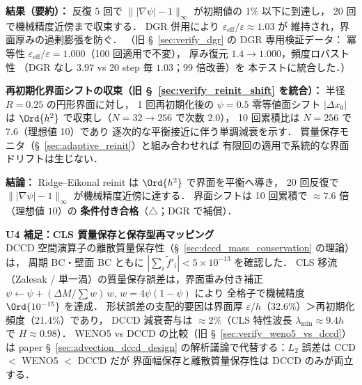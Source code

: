 \noindent\textbf{結果（要約）：}
反復 5 回で $\||\nabla\psi| - 1\|_\infty$ が初期値の 1\% 以下に到達し，
20 回で機械精度近傍まで収束する．
DGR 併用により $\varepsilon_{\mathrm{eff}}/\varepsilon \approx 1.03$ が
維持され，界面厚みの過剰膨張を防ぐ．
（旧 §~\ref{sec:verify_dgr} の DGR 専用検証データ：
冪等性 $\varepsilon_{\mathrm{eff}}/\varepsilon = 1.000$（100 回適用で不変），
厚み復元 $1.4 \to 1.000$，頻度ロバスト性
（DGR なし $3.97$ vs 20 step 毎 $1.03$；99 倍改善）を
本テストに統合した．）
\label{sec:verify_dgr}%

\medskip
\noindent\textbf{再初期化界面シフトの収束（旧 §~\ref{sec:verify_reinit_shift} を統合）：}
\label{sec:verify_reinit_shift}
半径 $R = 0.25$ の円形界面に対し，
1 回再初期化後の $\psi = 0.5$ 零等値面シフト $|\Delta x_0|$ は
$\Ord{h^2}$ で収束し（$N = 32 \to 256$ で次数 $2.0$），
10 回累積比は $N = 256$ で 7.6（理想値 10）であり
逐次的な平衡接近に伴う単調減衰を示す．
質量保存モニタ（§~\ref{sec:adaptive_reinit}）と組み合わせれば
有限回の適用で系統的な界面ドリフトは生じない．

\noindent\textbf{結論：}
Ridge--Eikonal reinit は $\Ord{h^2}$ で界面を平衡へ導き，
20 回反復で $\||\nabla\psi| - 1\|_\infty$ が機械精度近傍に達する．
界面シフトは 10 回累積で $\approx 7.6$ 倍（理想値 $10$）の
\textbf{条件付き合格}（$\triangle$；DGR で補償）．

\medskip
\noindent\textbf{U4 補足：CLS 質量保存と保存型再マッピング}\\
\noindent\label{sec:verify_cls_advection}%
\noindent\label{sec:verify_dccd_conservation}%
DCCD 空間演算子の離散質量保存性（§~\ref{sec:dccd_mass_conservation} の理論）は，
周期 BC・壁面 BC ともに $|\sum_i \tilde{f}'_i| < 5 \times 10^{-13}$ を確認した．
CLS 移流（Zalesak / 単一渦）の質量保存誤差は，界面重み付き補正
$\psi \leftarrow \psi + (\Delta M / \sum w)\,w$, $w = 4\psi(1 - \psi)$ により
全格子で機械精度 $\Ord{10^{-15}}$ を達成．
形状誤差の支配的要因は界面厚 $\varepsilon/h$（32.6\%）＞再初期化頻度（21.4\%）であり，
DCCD 減衰寄与は $\approx 2\%$（CLS 特性波長 $\lambda_{\min} \approx 9.4h$ で $H \approx 0.98$）．
WENO5 vs DCCD の比較（旧 §~\ref{sec:verify_weno5_vs_dccd}）は paper §~\ref{sec:advection_dccd_design}
の解析議論で代替する：$L_2$ 誤差は CCD $<$ WENO5 $<$ DCCD だが
界面幅保存と離散質量保存性は DCCD のみが両立する．
\label{sec:verify_weno5_vs_dccd}%

